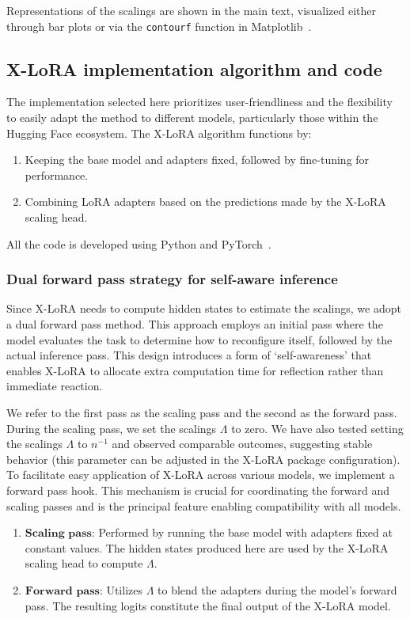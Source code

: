 Representations of the scalings are shown in the main text, visualized either through bar plots or via the \texttt{contourf} function in Matplotlib~\cite{MatplotlibDocumentation}.

\subsection{X-LoRA implementation algorithm and code} The implementation selected here prioritizes user-friendliness and the flexibility to easily adapt the method to different models, particularly those within the Hugging Face ecosystem. The X-LoRA algorithm functions by:

\begin{enumerate}
    \item Keeping the base model and adapters fixed, followed by fine-tuning for performance.
    \item Combining LoRA adapters based on the predictions made by the X-LoRA scaling head.
\end{enumerate}

All the code is developed using Python and PyTorch~\cite{Paszke2019PyTorchLibrary}. 

\subsubsection{Dual forward pass strategy for self-aware inference} Since X-LoRA needs to compute hidden states to estimate the scalings, we adopt a dual forward pass method. This approach employs an initial pass where the model evaluates the task to determine how to reconfigure itself, followed by the actual inference pass. This design introduces a form of `self-awareness' that enables X-LoRA to allocate extra computation time for reflection rather than immediate reaction.

We refer to the first pass as the scaling pass and the second as the forward pass. During the scaling pass, we set the scalings $\Lambda$ to zero. We have also tested setting the scalings $\Lambda$ to ${n}^{-1}$ and observed comparable outcomes, suggesting stable behavior (this parameter can be adjusted in the X-LoRA package configuration). To facilitate easy application of X-LoRA across various models, we implement a forward pass hook. This mechanism is crucial for coordinating the forward and scaling passes and is the principal feature enabling compatibility with all models.

\begin{enumerate}
    \item $\mathbf{Scaling}$ $\mathbf{pass}$: Performed by running the base model with adapters fixed at constant values. The hidden states produced here are used by the X-LoRA scaling head to compute $\Lambda$.
    \item $\mathbf{Forward}$ $\mathbf{pass}$: Utilizes $\Lambda$ to blend the adapters during the model’s forward pass. The resulting logits constitute the final output of the X-LoRA model.
\end{enumerate}

